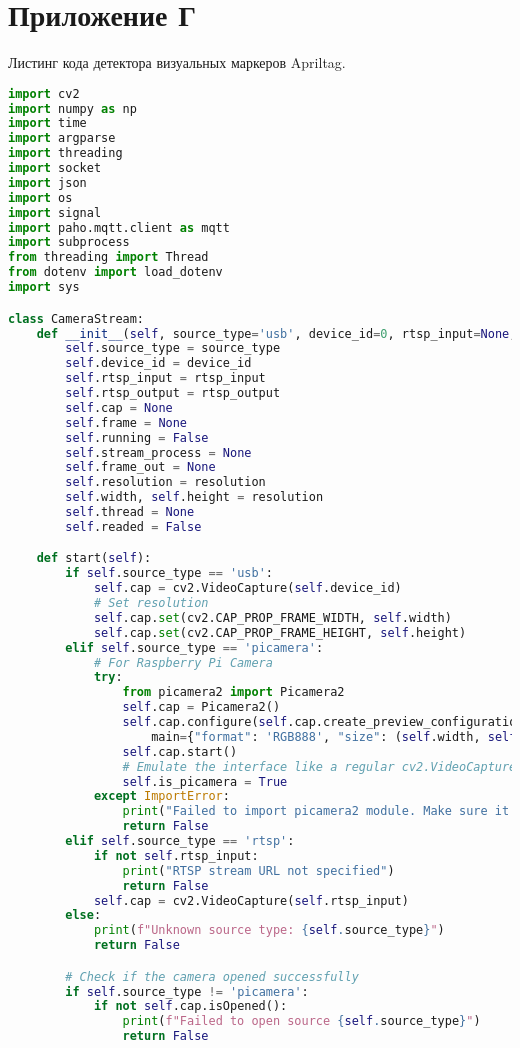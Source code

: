 \chapter{Приложение Г}

Листинг кода детектора визуальных маркеров Apriltag.

\begin{lstlisting}[language=Python]
import cv2
import numpy as np
import time
import argparse
import threading
import socket
import json
import os
import signal
import paho.mqtt.client as mqtt
import subprocess
from threading import Thread
from dotenv import load_dotenv
import sys

class CameraStream:
    def __init__(self, source_type='usb', device_id=0, rtsp_input=None, rtsp_output=None, resolution=(640, 480)):
        self.source_type = source_type
        self.device_id = device_id
        self.rtsp_input = rtsp_input
        self.rtsp_output = rtsp_output
        self.cap = None
        self.frame = None
        self.running = False
        self.stream_process = None
        self.frame_out = None
        self.resolution = resolution
        self.width, self.height = resolution
        self.thread = None
        self.readed = False

    def start(self):
        if self.source_type == 'usb':
            self.cap = cv2.VideoCapture(self.device_id)
            # Set resolution
            self.cap.set(cv2.CAP_PROP_FRAME_WIDTH, self.width)
            self.cap.set(cv2.CAP_PROP_FRAME_HEIGHT, self.height)
        elif self.source_type == 'picamera':
            # For Raspberry Pi Camera
            try:
                from picamera2 import Picamera2
                self.cap = Picamera2()
                self.cap.configure(self.cap.create_preview_configuration(
                    main={"format": 'RGB888', "size": (self.width, self.height)}))
                self.cap.start()
                # Emulate the interface like a regular cv2.VideoCapture
                self.is_picamera = True
            except ImportError:
                print("Failed to import picamera2 module. Make sure it is installed.")
                return False
        elif self.source_type == 'rtsp':
            if not self.rtsp_input:
                print("RTSP stream URL not specified")
                return False
            self.cap = cv2.VideoCapture(self.rtsp_input)
        else:
            print(f"Unknown source type: {self.source_type}")
            return False

        # Check if the camera opened successfully
        if self.source_type != 'picamera':
            if not self.cap.isOpened():
                print(f"Failed to open source {self.source_type}")
                return False


\end{lstlisting}
